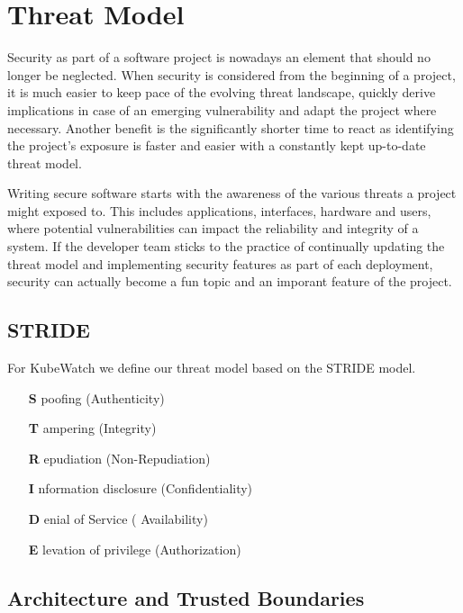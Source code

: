 \chapter{Threat Model}

Security as part of a software project is nowadays an element that should no longer be neglected. When security is considered from the beginning of a project, it is much easier to keep pace of the evolving threat landscape, quickly derive implications in case of an emerging vulnerability and adapt the project where necessary. Another benefit is the significantly shorter time to react as identifying the project's exposure is faster and easier with a constantly kept up-to-date threat model.

Writing secure software starts with the awareness of the various threats a project might exposed to. This includes applications, interfaces, hardware and users, where potential vulnerabilities can impact the reliability and integrity of a system. If the developer team sticks to the practice of continually updating the threat model and implementing security features as part of each deployment, security can actually become a fun topic and an imporant feature of the project.

\section{STRIDE}

For KubeWatch we define our threat model based on the STRIDE model.
\begin{itemize}
    \item [{\bfseries S}]poofing (Authenticity)
    \item [{\bfseries T}]ampering (Integrity)
    \item [{\bfseries R}]epudiation (Non-Repudiation)
    \item [{\bfseries I}]nformation disclosure (Confidentiality)
    \item [{\bfseries D}]enial of Service ( Availability)
    \item [{\bfseries E}]levation of privilege (Authorization)
\end{itemize}


\section{Architecture and Trusted Boundaries}

